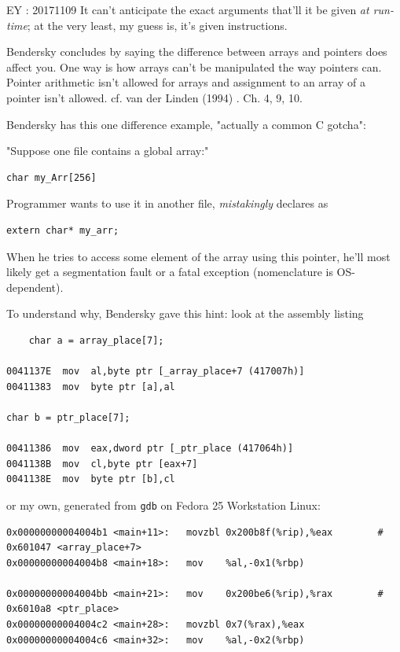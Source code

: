 \documentclass[10pt]{amsart}
\begin{document}
\begin{multicols*}{2}
EY : 20171109 It can't anticipate the exact arguments that'll it be given \emph{at run-time}; at the very least, my guess is, it's given instructions.  

Bendersky \cite{Bend} concludes by saying the difference between arrays and pointers does affect you.  One way is how arrays can't be manipulated the way pointers can.  Pointer arithmetic isn't allowed for arrays and assignment to an array of a pointer isn't allowed.  cf. van der Linden (1994) \cite{Vand1994}. Ch. 4, 9, 10.  

Bendersky \cite{Bend} has this one difference example, "actually a common C gotcha":  

"Suppose one file contains a global array:"  

\begin{lstlisting}
char my_Arr[256]  
\end{lstlisting}

Programmer wants to use it in another file, \emph{mistakingly} declares as  
\begin{lstlisting}
extern char* my_arr; 
\end{lstlisting}

When he tries to access some element of the array using this pointer, he'll most likely get a segmentation fault or a fatal exception (nomenclature is OS-dependent).  

To understand why, Bendersky \cite{Bend} gave this hint:  look at the assembly listing  

\begin{lstlisting}
    char a = array_place[7];

0041137E  mov  al,byte ptr [_array_place+7 (417007h)]
00411383  mov  byte ptr [a],al

char b = ptr_place[7];

00411386  mov  eax,dword ptr [_ptr_place (417064h)]
0041138B  mov  cl,byte ptr [eax+7]
0041138E  mov  byte ptr [b],cl
\end{lstlisting}

or my own, generated from \verb|gdb| on Fedora 25 Workstation Linux:

\begin{lstlisting}
0x00000000004004b1 <main+11>:	movzbl 0x200b8f(%rip),%eax        # 0x601047 <array_place+7>
0x00000000004004b8 <main+18>:	mov    %al,-0x1(%rbp)

0x00000000004004bb <main+21>:	mov    0x200be6(%rip),%rax        # 0x6010a8 <ptr_place>
0x00000000004004c2 <main+28>:	movzbl 0x7(%rax),%eax
0x00000000004004c6 <main+32>:	mov    %al,-0x2(%rbp)
\end{lstlisting}


\end{multicols*}
\end{document}
